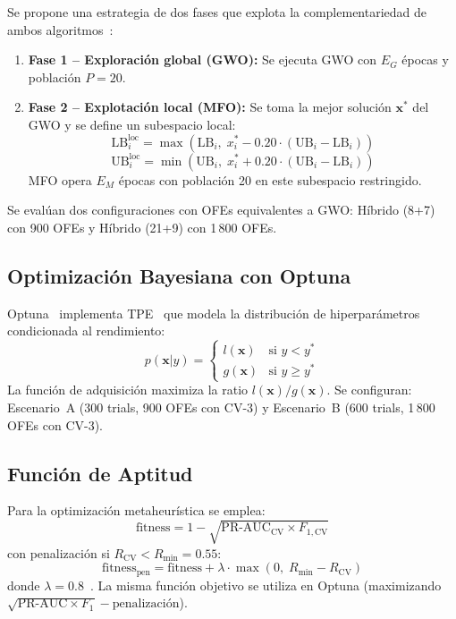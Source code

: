 \documentclass[journal]{IEEEtran}
\begin{document}
Se propone una estrategia de dos fases que explota la complementariedad de ambos algoritmos~\cite{blum2003, wolpert1997}:
\begin{enumerate}[leftmargin=*]
    \item \textbf{Fase 1 -- Exploración global (GWO):} Se ejecuta GWO con $E_G$ épocas y población $P = 20$.
    \item \textbf{Fase 2 -- Explotación local (MFO):} Se toma la mejor solución $\mathbf{x}^*$ del GWO y se define un subespacio local:
    \begin{equation}
        \text{LB}_i^{\text{loc}} = \max\left(\text{LB}_i,\; x_i^* - 0.20 \cdot (\text{UB}_i - \text{LB}_i)\right)
        \label{eq:local_lb}
    \end{equation}
    \begin{equation}
        \text{UB}_i^{\text{loc}} = \min\left(\text{UB}_i,\; x_i^* + 0.20 \cdot (\text{UB}_i - \text{LB}_i)\right)
        \label{eq:local_ub}
    \end{equation}
    MFO opera $E_M$ épocas con población 20 en este subespacio restringido.
\end{enumerate}

Se evalúan dos configuraciones con OFEs equivalentes a GWO: Híbrido (8+7) con 900 OFEs y Híbrido (21+9) con 1\,800 OFEs.

\subsection{Optimización Bayesiana con Optuna}
\label{sec:optuna}

Optuna~\cite{akiba2019} implementa TPE~\cite{bergstra2011} que modela la distribución de hiperparámetros condicionada al rendimiento:
\begin{equation}
    p(\mathbf{x}|y) = \begin{cases} l(\mathbf{x}) & \text{si } y < y^* \\ g(\mathbf{x}) & \text{si } y \geq y^* \end{cases}
    \label{eq:tpe}
\end{equation}
La función de adquisición maximiza la ratio $l(\mathbf{x})/g(\mathbf{x})$. Se configuran: Escenario~A (300 trials, 900 OFEs con CV-3) y Escenario~B (600 trials, 1\,800 OFEs con CV-3).

\subsection{Función de Aptitud}
Para la optimización metaheurística se emplea:
\begin{equation}
    \text{fitness} = 1 - \sqrt{\text{PR-AUC}_{\text{CV}} \times F_{1,\text{CV}}}
    \label{eq:fitness}
\end{equation}
con penalización si $R_{\text{CV}} < R_{\min} = 0.55$:
\begin{equation}
    \text{fitness}_{\text{pen}} = \text{fitness} + \lambda \cdot \max(0,\; R_{\min} - R_{\text{CV}})
    \label{eq:penalty}
\end{equation}
donde $\lambda = 0.8$~\cite{he2009}. La misma función objetivo se utiliza en Optuna (maximizando $\sqrt{\text{PR-AUC} \times F_1} - \text{penalización}$).
\end{document}
